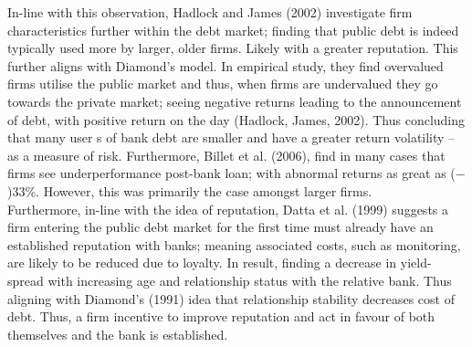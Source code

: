 \documentclass[11pt, english]{article}
\begin{document}
	In-line with this observation, Hadlock and James (2002) investigate firm characteristics further within the debt market; finding that public debt is indeed typically used more by larger, older firms. Likely with a greater reputation. This further aligns with Diamond’s model. In empirical study, they find overvalued firms utilise the public market and thus, when firms are undervalued they go towards the private market; seeing negative returns leading to the announcement of debt, with positive return on the day (Hadlock, James, 2002). Thus concluding that many user s of bank debt are smaller and have a greater return volatility – as a measure of risk. Furthermore, Billet et al. (2006), find in many cases that firms see underperformance post-bank loan; with abnormal returns as great as ($-$)33\%. However, this was primarily the case amongst larger firms.\\

	Furthermore, in-line with the idea of reputation, Datta et al. (1999) suggests a firm entering the public debt market for the first time must already have an established reputation with banks; meaning associated costs, such as monitoring, are likely to be reduced due to loyalty. In result, finding a decrease in yield-spread with increasing age and relationship status with the relative bank. Thus aligning with Diamond’s (1991) idea that relationship stability decreases cost of debt. Thus, a firm incentive to improve reputation and act in favour of both themselves and the bank is established.
\end{document}

